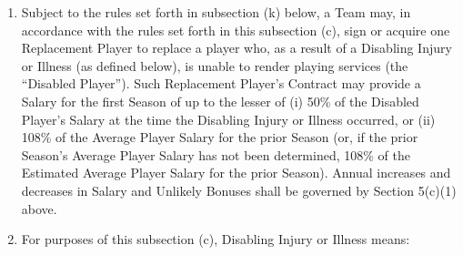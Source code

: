 \documentclass[
]{book}
\providecommand{\tightlist}{%
  \setlength{\itemsep}{0pt}\setlength{\parskip}{0pt}}
\begin{document}
\begin{enumerate}
  \begin{enumerate}
  \def\labelenumii{(\arabic{enumii})}
  \tightlist
  \item
    Subject to the rules set forth in subsection (k) below, a Team may, in accordance with the rules set forth in this subsection (c), sign or acquire one Replacement Player to replace a player who, as a result of a Disabling Injury or Illness (as defined below), is unable to render playing services (the ``Disabled Player''). Such Replacement Player's Contract may provide a Salary for the first Season of up to the lesser of (i) 50\% of the Disabled Player's Salary at the time the Disabling Injury or Illness occurred, or (ii) 108\% of the Average Player Salary for the prior Season (or, if the prior Season's Average Player Salary has not been determined, 108\% of the Estimated Average Player Salary for the prior Season). Annual increases and decreases in Salary and Unlikely Bonuses shall be governed by Section 5(c)(1) above.
  \item
    For purposes of this subsection (c), Disabling Injury or Illness means:


\end{enumerate}
\end{enumerate}
\end{document}
